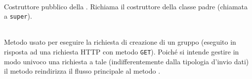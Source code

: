\begin{description}
	\item{}\\
	Costruttore pubblico della . Richiama il costruttore della classe padre (chiamata a \texttt{super}).
	
	\item{}\\
	Metodo usato per eseguire la richiesta di creazione di un gruppo (eseguito in risposta ad una richiesta HTTP con metodo \texttt{GET}). Poiché si intende gestire in modo univoco una richiesta a tale  (indifferentemente dalla tipologia d'invio dati) il metodo reindirizza il flusso principale al metodo .
	

\end{description}
